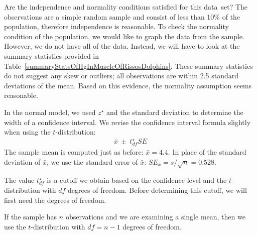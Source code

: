 \begin{example}{Are the independence and normality conditions satisfied for this data~set?}
The observations are a simple random sample and consist of less than 10\% of the population, therefore independence is reasonable. To check the normality condition of the population, we would like to graph the data from the sample. However, we do not have all of the data. Instead, we will have to look at the summary statistics provided in Table~\ref{summaryStatsOfHgInMuscleOfRissosDolphins}. These summary statistics do not suggest any skew or outliers; all observations are within 2.5 standard deviations of the mean. Based on this evidence, the normality assumption seems reasonable.
\end{example}

In the normal model, we used $z^{\star}$ and the standard deviation to determine the width of a confidence interval. We revise the confidence interval formula slightly when using the $t$-distribution:
\begin{eqnarray*}
\bar{x} \ \pm\  t^{\star}_{df}SE
\end{eqnarray*}
The sample mean is computed just as before: $\bar{x} = 4.4$. In place of the standard deviation of $\bar{x}$, we use the standard error of $\bar{x}$: $SE_{\bar{x}} = s/\sqrt{n} = 0.528$.

The value $t^{\star}_{df}$ is a cutoff we obtain based on the confidence level and the $t$-distribution with $df$ degrees of freedom. Before determining this cutoff, we will first need the degrees of freedom.

\begin{termBox}{
If the sample has $n$ observations and we are examining a single mean, then we use the $t$-distribution with $df=n-1$ degrees of freedom.}
\end{termBox}

